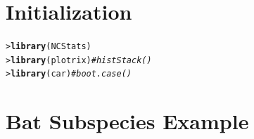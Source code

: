 \documentclass{article}\usepackage[]{graphicx}\usepackage[]{color}
\makeatletter
\newcommand{\hlcom}[1]{\textcolor[rgb]{0.678,0.584,0.686}{\textit{#1}}}%
\newcommand{\hlstd}[1]{\textcolor[rgb]{0.345,0.345,0.345}{#1}}%
\newcommand{\hlkwd}[1]{\textcolor[rgb]{0.737,0.353,0.396}{\textbf{#1}}}%
\newenvironment{kframe}{%
 \def\at@end@of@kframe{}%
 \ifinner\ifhmode%
  \def\at@end@of@kframe{\end{minipage}}%
  \begin{minipage}{\columnwidth}%
 \fi\fi%
 \def\FrameCommand##1{\hskip\@totalleftmargin \hskip-\fboxsep
 \colorbox{shadecolor}{##1}\hskip-\fboxsep
     \hskip-\linewidth \hskip-\@totalleftmargin \hskip\columnwidth}%
 \MakeFramed {\advance\hsize-\width
   \@totalleftmargin\z@ \linewidth\hsize
   \@setminipage}}%
 {\par\unskip\endMakeFramed%
 \at@end@of@kframe}
\newenvironment{knitrout}{}{} %
\makeatother
\begin{document}


\section*{Initialization} \label{sect:Inits}
\vspace{-18pt}
\begin{knitrout}
\color{fgcolor}\begin{kframe}
\begin{alltt}
\hlstd{> }\hlkwd{library}\hlstd{(NCStats)}
\hlstd{> }\hlkwd{library}\hlstd{(plotrix)}  \hlcom{#histStack()}
\hlstd{> }\hlkwd{library}\hlstd{(car)}      \hlcom{#boot.case()}
\end{alltt}
\end{kframe}
\end{knitrout}

\vspace{-16pt}
\section{Bat Subspecies Example}
\vspace{-12pt}
\end{document}
